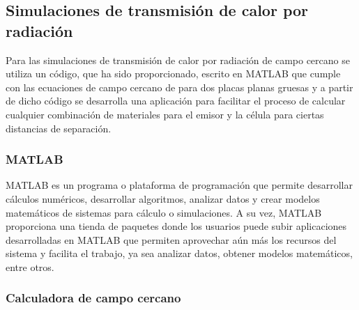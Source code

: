 \subsection{Simulaciones de transmisión de calor por radiación}
Para las simulaciones de transmisión de calor por radiación de campo cercano se utiliza un código, que ha sido proporcionado, escrito en MATLAB que cumple con las ecuaciones de campo cercano de \cite{nfTPV_equations} para dos placas planas gruesas y a partir de dicho código se desarrolla una aplicación para facilitar el proceso de calcular cualquier combinación de materiales para el emisor y la célula para ciertas distancias de separación.\\
\subsubsection{MATLAB}
MATLAB es un programa o plataforma de programación que permite desarrollar cálculos numéricos, desarrollar algoritmos, analizar datos y crear modelos matemáticos de sistemas para cálculo o simulaciones. A su vez, MATLAB proporciona una tienda de paquetes donde los usuarios puede subir aplicaciones desarrolladas en MATLAB que permiten aprovechar aún más los recursos del sistema y facilita el trabajo, ya sea analizar datos, obtener modelos matemáticos, entre otros.\\
\subsubsection{Calculadora de campo cercano}